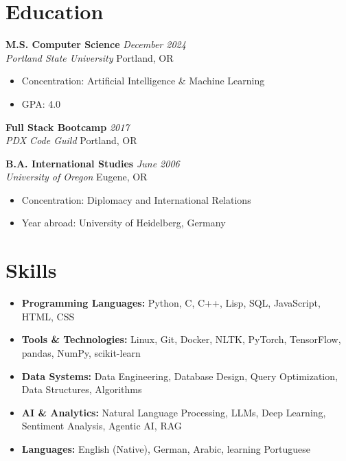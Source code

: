 \documentclass[letterpaper,11pt]{article}
\newcommand{\entry}[4]{
  \vspace{0.1em}
  \noindent\textbf{#1} \hfill \textit{#2}
  \\ \textit{#3} \hfill #4
  \vspace{0.3em}
}
\newcommand{\achievement}[1]{
  \vspace{-.5em}
  \item #1
}
\begin{document}
\section{Education}

\entry{M.S. Computer Science}{December 2024}{Portland State University}{Portland, OR}
\vspace{-.1cm}
\begin{itemize}[leftmargin=*]
  \achievement{Concentration: Artificial Intelligence \& Machine Learning}
  \achievement{GPA: 4.0}
\end{itemize}

\entry{Full Stack Bootcamp}{2017}{PDX Code Guild}{Portland, OR}

\entry{B.A. International Studies}{June 2006}{University of Oregon}{Eugene, OR}
\vspace{-.1cm}
\begin{itemize}[leftmargin=*]
  \achievement{Concentration: Diplomacy and International Relations}
  \achievement{Year abroad: University of Heidelberg, Germany}
\end{itemize}

\section{Skills}
\begin{itemize}[leftmargin=*, itemsep=-0.2em]
  \item \textbf{Programming Languages:} Python, C, C++, Lisp, SQL, JavaScript, HTML, CSS
  \item \textbf{Tools \& Technologies:} Linux, Git, Docker, NLTK, PyTorch, TensorFlow, pandas, NumPy, scikit-learn
  \item \textbf{Data Systems:} Data Engineering, Database Design, Query Optimization, Data Structures, Algorithms
  \item \textbf{AI \& Analytics:} Natural Language Processing, LLMs, Deep Learning, Sentiment Analysis, Agentic AI, RAG
  \item \textbf{Languages:} English (Native), German, Arabic, learning Portuguese
\end{itemize}
 
\end{document}
